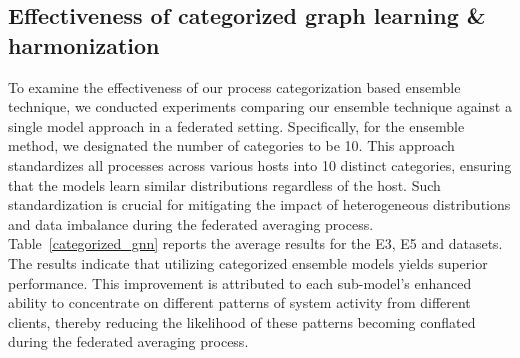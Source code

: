 \subsection{Effectiveness of categorized graph learning \&  \wordvec harmonization}

To examine the effectiveness of our process categorization based \gnnshort ensemble technique, we conducted experiments comparing our ensemble technique against a single model approach in a federated setting. Specifically, for the ensemble method, we designated the number of categories to be 10. This approach standardizes all processes across various hosts into 10 distinct categories, ensuring that the \gnnshort models learn similar distributions regardless of the host. Such standardization is crucial for mitigating the impact of heterogeneous distributions and data imbalance during the federated averaging process. Table~\ref{categorized_gnn} reports the average results for the \darpa E3, E5 and \optc datasets. The results indicate that utilizing categorized ensemble models yields superior performance. This improvement is attributed to each sub-model's enhanced ability to concentrate on different patterns of system activity from different clients, thereby reducing the likelihood of these patterns becoming conflated during the federated averaging process. %



